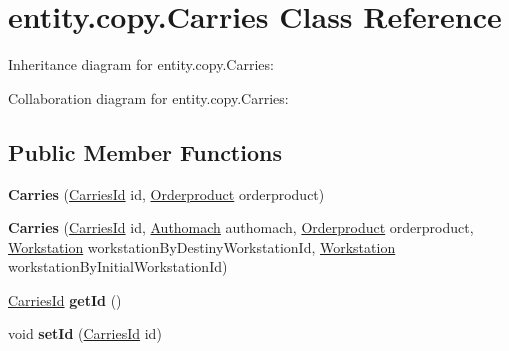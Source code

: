 \hypertarget{classentity_1_1copy_1_1_carries}{}\section{entity.\+copy.\+Carries Class Reference}
\label{classentity_1_1copy_1_1_carries}


Inheritance diagram for entity.\+copy.\+Carries\+:


Collaboration diagram for entity.\+copy.\+Carries\+:
\subsection*{Public Member Functions}
\begin{DoxyCompactItemize}
\item 
\mbox{\label{classentity_1_1copy_1_1_carries_aeaec16c60fb4f88a6d0e3a96cb98d68d}} 
{\bfseries Carries} (\mbox{\hyperlink{classentity_1_1copy_1_1_carries_id}{Carries\+Id}} id, \mbox{\hyperlink{classentity_1_1copy_1_1_orderproduct}{Orderproduct}} orderproduct)
\item 
\mbox{\label{classentity_1_1copy_1_1_carries_ae3456ca921defd8681c6d49fb8c62e83}} 
{\bfseries Carries} (\mbox{\hyperlink{classentity_1_1copy_1_1_carries_id}{Carries\+Id}} id, \mbox{\hyperlink{classentity_1_1copy_1_1_authomach}{Authomach}} authomach, \mbox{\hyperlink{classentity_1_1copy_1_1_orderproduct}{Orderproduct}} orderproduct, \mbox{\hyperlink{classentity_1_1copy_1_1_workstation}{Workstation}} workstation\+By\+Destiny\+Workstation\+Id, \mbox{\hyperlink{classentity_1_1copy_1_1_workstation}{Workstation}} workstation\+By\+Initial\+Workstation\+Id)
\item 
\mbox{\label{classentity_1_1copy_1_1_carries_ad43a95853c171a2bb2cf36c3bd3d5120}} 
\mbox{\hyperlink{classentity_1_1copy_1_1_carries_id}{Carries\+Id}} {\bfseries get\+Id} ()
\item 
\mbox{\label{classentity_1_1copy_1_1_carries_a61b5a3743df6e27848fd70b53009fb77}} 
void {\bfseries set\+Id} (\mbox{\hyperlink{classentity_1_1copy_1_1_carries_id}{Carries\+Id}} id)
\item 
\mbox{\label{classentity_1_1copy_1_1_carries_a0ec3f603cbeacaa2b432a185d736fd62}} 

\end{DoxyCompactItemize}

